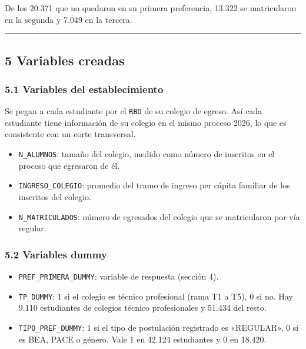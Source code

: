 \documentclass[11pt,letterpaper]{article}
\begin{document}
De los 20.371 que no quedaron en su primera preferencia, 13.322 se
matricularon en la segunda y 7.049 en la tercera.

\medskip\hrule\medskip

\subsection*{5 \; Variables creadas}

\subsubsection*{5.1 \; Variables del establecimiento}

Se pegan a cada estudiante por el \texttt{RBD} de su colegio de egreso.
Así cada estudiante tiene información de su colegio en el mismo proceso
2026, lo que es consistente con un corte transversal.

\begin{itemize}[leftmargin=1.5em, itemsep=0.3em]
  \item \texttt{N\_ALUMNOS}: tamaño del colegio, medido como número de
        inscritos en el proceso que egresaron de él.
  \item \texttt{INGRESO\_COLEGIO}: promedio del tramo de ingreso per
        cápita familiar de los inscritos del colegio.
  \item \texttt{N\_MATRICULADOS}: número de egresados del colegio que se
        matricularon por vía regular.
\end{itemize}

\subsubsection*{5.2 \; Variables dummy}

\begin{itemize}[leftmargin=1.5em, itemsep=0.3em]
  \item \texttt{PREF\_PRIMERA\_DUMMY}: variable de respuesta (sección 4).
  \item \texttt{TP\_DUMMY}: 1 si el colegio es técnico profesional
        (rama T1 a T5), 0 si no. Hay 9.110 estudiantes de colegios
        técnico profesionales y 51.434 del resto.
  \item \texttt{TIPO\_PREF\_DUMMY}: 1 si el tipo de postulación
        registrado es «REGULAR», 0 si es BEA, PACE o género. Vale 1 en
        42.124 estudiantes y 0 en 18.420.
\end{itemize}
\end{document}
